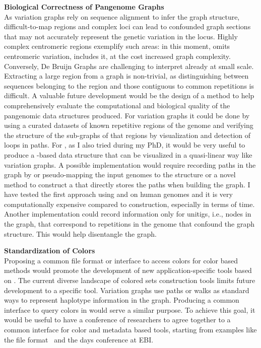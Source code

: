 \textbf{Biological Correctness of Pangenome Graphs}\\
As variation graphs rely on sequence alignment to infer the graph structure, difficult-to-map regions and complex loci can lead to confounded graph sections that may not accurately represent the genetic variation in the locus. Highly complex centromeric regions exemplify such areas: in this moment, \mcactus omits centromeric variation, \pggb includes it, at the cost increased graph complexity. \\
Conversely, De Bruijn Graphs are challenging to interpret already at small scale. Extracting a large region from a graph is non-trivial, as distinguishing between sequences belonging to the region and those contiguous to common repetitions is difficult.
A valuable future development would be the design of a method to help comprehensively evaluate the computational and biological quality of the pangenomic data structures produced. For variation graphs it could be done by using a curated datasets of known repetitive regions of the genome and verifying the structure of the sub-graphs of that regions by visualization and detection of loops in paths. For \dbgs, as I also tried during my PhD, it would be very useful to produce a \dbg-based data structure that can be visualized in a quasi-linear way like variation graphs. A possible implementation would require recording paths in the graph by or pseudo-mapping the input genomes to the \ccdbg structure or a novel method to construct a \cdbg that directly stores the paths when building the graph. I have tested the first approach using \ggcat and \ssh on human genomes and it is very computationally expensive compared to \ccdbg construction, especially in terms of time. Another implementation could record information only for unitigs, i.e., nodes in the graph, that correspond to repetitions in the genome that confound the graph structure. This would help disentangle the graph.


\textbf{Standardization of \dbg Colors}\\
Proposing a common file format or interface to access colors for color \dbg based methods would promote the development of new application-specific tools based on \kmers. The current diverse landscape of colored \kmer sets construction tools limits future development to a specific tool. Variation graphs use paths or walks as standard ways to represent haplotype information in the graph. Producing a common interface to query colors in \dbgs would serve a similar purpose. To achieve this goal, it would be useful to have a conference of \kmer researchers to agree together to a common interface for color and metadata based tools, starting from examples like the \kmer file format~\cite{kff} and the \kmer days conference at EBI.


